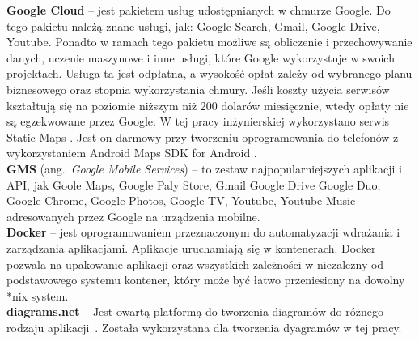 \noindent\textbf{Google Cloud} -- jest pakietem usług udostępnianych w chmurze Google. Do tego pakietu należą znane usługi, jak: Google Search, Gmail, Google Drive, Youtube. Ponadto w ramach tego pakietu możliwe są obliczenie i przechowywanie danych, uczenie maszynowe i inne usługi, które Google wykorzystuje w swoich projektach. \cite{google_cloud} 
Usługa ta jest odpłatna, a wysokość opłat zależy od wybranego planu biznesowego oraz stopnia wykorzystania chmury. Jeśli koszty użycia serwisów kształtują się na poziomie niższym niż 200 dolarów miesięcznie, wtedy opłaty nie są egzekwowane przez Google. W tej pracy inżynierskiej wykorzystano serwis Static Maps \cite{google_cloud_pricing}. Jest on darmowy przy tworzeniu oprogramowania do telefonów z wykorzystaniem Android Maps SDK for Android \cite{maps_sdk}. \\

\noindent\textbf{GMS} (ang.~\emph{Google Mobile Services}) -- to zestaw najpopularniejszych aplikacji i API, jak  Goole Maps, Google Paly Store, Gmail Google Drive Google Duo, Google Chrome, Google Photos, Google TV, Youtube, Youtube Music adresowanych przez Google na urządzenia mobilne. \\

\noindent\textbf{Docker} -- jest oprogramowaniem przeznaczonym do automatyzacji wdrażania i zarządzania aplikacjami. Aplikacje uruchamiają się w kontenerach. Docker pozwala na upakowanie aplikacji oraz wszystkich zależności w niezależny od podstawowego systemu kontener, który może być łatwo przeniesiony na dowolny *nix system.~\cite{docker,docker_doc} \\

\noindent\textbf{diagrams.net} -- Jest owartą platformą do tworzenia diagramów do różnego rodzaju aplikacji~\cite{diagrams_net}. Została wykorzystana dla tworzenia dyagramów w tej pracy. \\

% 
